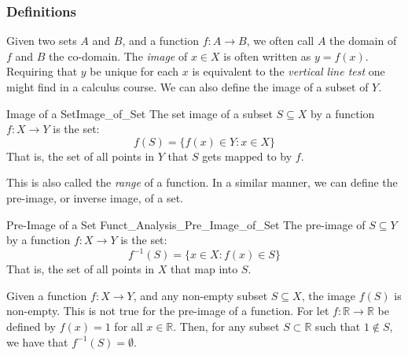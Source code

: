             \subsubsection{Definitions}
                Given two sets $A$ and $B$, and a function
                $f:A\rightarrow{B}$, we often call $A$ the
                domain of $f$ and $B$ the co-domain.
                The \textit{image} of $x\in{X}$ is often written
                as $y=f(x)$. Requiring that $y$ be unique for each
                $x$ is equivalent to the \textit{vertical line test}
                one might find in a calculus course. We can also
                define the image of a subset of $Y$.
                \begin{ldefinition}{Image of a Set}{Image_of_Set}
                    The \gls{set image} of a subset
                    $S\subseteq{X}$ by a function
                    $f:X\rightarrow{Y}$ is the set:
                    \begin{equation}
                        f(S)=\{f(x)\in{Y}:x\in{X}\}
                    \end{equation}
                    That is, the set of all points in $Y$ that $S$
                    gets mapped to by $f$.
                \end{ldefinition}
                This is also called the \textit{range} of a function.
                In a similar manner, we can define the pre-image, or
                inverse image, of a set.
                \begin{ldefinition}{Pre-Image of a Set}
                      {Funct_Analysis_Pre_Image_of_Set}
                    The \gls{pre-image} of $S\subseteq{Y}$
                    by a function $f:X\rightarrow{Y}$ is the set:
                    \begin{equation}
                        f^{\minus{1}}(S)=\{x\in{X}:f(x)\in{S}\}
                    \end{equation}
                    That is, the set of all points in $X$ that map
                    into $S$.
                \end{ldefinition}
                \begin{lexample}
                    Given a function $f:X\rightarrow{Y}$, and any
                    non-empty subset $S\subseteq{X}$, the image
                    $f(S)$ is non-empty. This is not true for the
                    pre-image of a function. For let
                    $f:\mathbb{R}\rightarrow\mathbb{R}$ be defined by
                    $f(x)=1$ for all $x\in\mathbb{R}$. Then, for any
                    subset $S\subset\mathbb{R}$ such that
                    $1\notin{S}$, we have that
                    $f^{\minus{1}}(S)=\emptyset$.
                \end{lexample}
